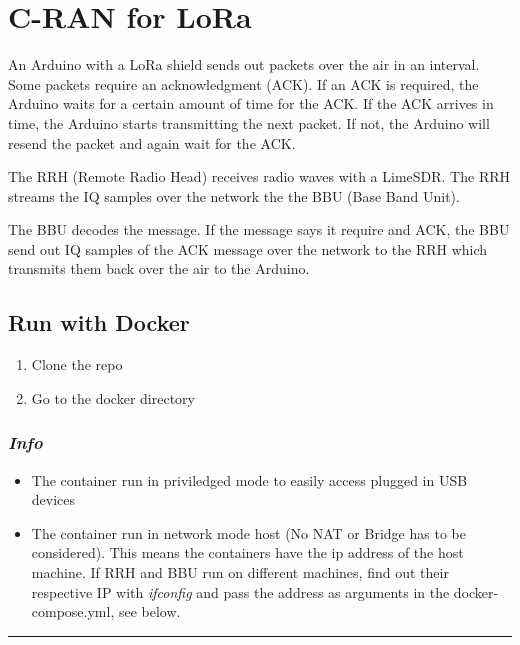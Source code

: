 \section{C-RAN for LoRa}\label{c-ran-for-lora}

An Arduino with a LoRa shield sends out packets over the air in an
interval. Some packets require an acknowledgment (ACK). If an ACK is
required, the Arduino waits for a certain amount of time for the ACK. If
the ACK arrives in time, the Arduino starts transmitting the next
packet. If not, the Arduino will resend the packet and again wait for
the ACK.

The RRH (Remote Radio Head) receives radio waves with a LimeSDR. The RRH
streams the IQ samples over the network the the BBU (Base Band Unit).

The BBU decodes the message. If the message says it require and ACK, the
BBU send out IQ samples of the ACK message over the network to the RRH
which transmits them back over the air to the Arduino.

\subsection{Run with Docker}\label{run-with-docker}

\begin{enumerate}
\def\labelenumi{\arabic{enumi}.}
\tightlist
\item
  Clone the repo
\item
  Go to the docker directory
\end{enumerate}

\subsubsection{\texorpdfstring{\textbf{\emph{Info}}}{Info}}\label{info}

\begin{itemize}
\tightlist
\item
  The container run in priviledged mode to easily access plugged in USB
  devices
\item
  The container run in network mode host (No NAT or Bridge has to be
  considered). This means the containers have the ip address of the host
  machine. If RRH and BBU run on different machines, find out their
  respective IP with \emph{ifconfig} and pass the address as arguments
  in the docker-compose.yml, see below.
\end{itemize}

\begin{center}\rule{0.5\linewidth}{\linethickness}\end{center}

